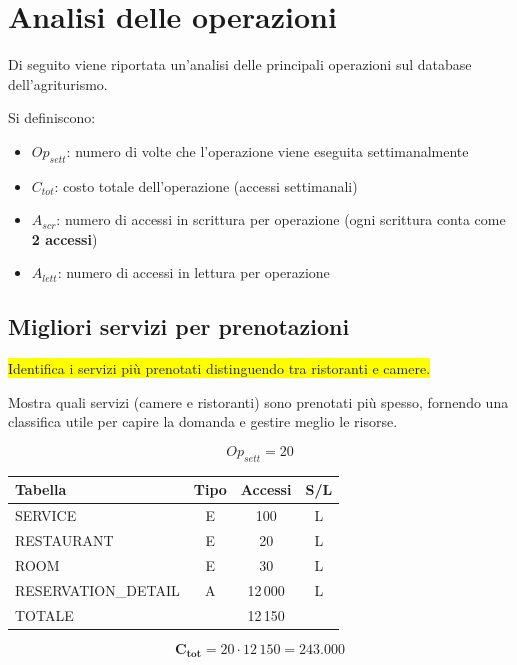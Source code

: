 \documentclass[a4paper,12pt]{report}
\begin{document}
\section{Analisi delle operazioni}
Di seguito viene riportata un'analisi delle principali operazioni
sul database dell'agriturismo.

Si definiscono:
\begin{itemize}
  \item $Op_{sett}$: numero di volte che l'operazione viene eseguita
    settimanalmente
  \item $C_{tot}$: costo totale dell'operazione (accessi settimanali)
  \item $A_{scr}$: numero di accessi in scrittura per operazione
    (ogni scrittura conta come \textbf{2 accessi})
  \item $A_{lett}$: numero di accessi in lettura per operazione
\end{itemize}

\newpage
\subsection*{Migliori servizi per prenotazioni} \label{op1}
\colorbox{yellow}{Identifica i servizi più prenotati distinguendo tra
ristoranti e camere.}

Mostra quali servizi (camere e ristoranti) sono
prenotati più spesso, fornendo una classifica utile per capire la
domanda e gestire meglio le risorse.

$$Op_{sett} = 20$$

\begin{table}[H]
  \centering
  \small
  \renewcommand{\arraystretch}{1.15}
  \begin{tabularx}{0.9\textwidth}{|X|c|c|c|}
    \hline
    \rowcolor{gray!20}
    \textbf{Tabella} & \textbf{Tipo} & \textbf{Accessi} & \textbf{S/L} \\
    \hline
    SERVICE & E & 100 & L \\
    RESTAURANT & E & 20 & L \\
    ROOM & E & 30 & L \\
    RESERVATION\_DETAIL & A & 12\,000 & L \\
    \hline
    \rowcolor{gray!20}
    TOTALE & & 12\,150 & \\
    \hline
  \end{tabularx}
  \vspace{-1em}
\end{table}

$$\mathbf{C_{tot}} = 20 \cdot 12\,150 = \mathbf{243.000}$$
\end{document}
